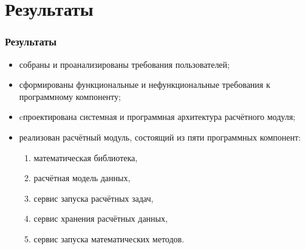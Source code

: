 \section{Результаты}

\begin{frame}
\frametitle{Результаты}
\begin{itemize}
    \item собраны и проанализированы требования пользователей;
    \item сформированы функциональные и нефункциональные требования к программному компоненту;
    \item cпроектирована системная и программная архитектура расчётного модуля;
    \item {
           реализован расчётный модуль, состоящий из пяти программных компонент:
            \begin{enumerate}
                \item математическая библиотека,
                \item расчётная модель данных,
                \item сервис запуска расчётных задач,
                \item сервис хранения расчётных данных,
                \item сервис запуска математических методов.
            \end{enumerate}
    }
\end{itemize}
\end{frame}

